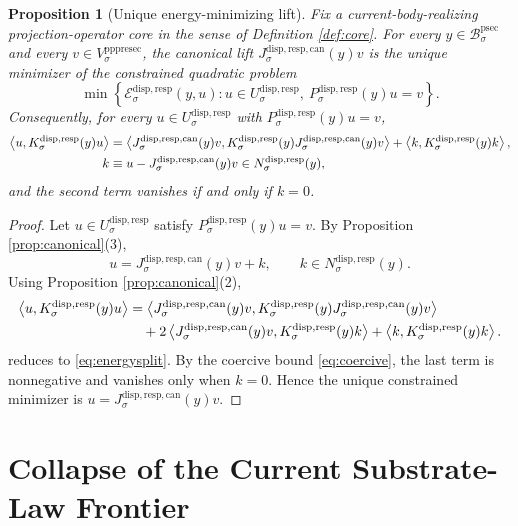 \documentclass[11pt]{article}
\newcommand{\ProtoSectionBody}[1]{\mathcal B_{#1}^{\mathrm{psec}}}
\newcommand{\PrePreProtoSectionVertical}[1]{V_{#1}^{\mathrm{pppresec}}}
\newcommand{\SubstrateCarrier}[1]{U_{#1}^{\mathrm{disp,resp}}}
\newcommand{\SubstrateProjection}[1]{P_{#1}^{\mathrm{disp,resp}}}
\newcommand{\SubstrateOperator}[1]{K_{#1}^{\mathrm{disp,resp}}}
\newcommand{\CanonicalLift}[1]{J_{#1}^{\mathrm{disp,resp,can}}}
\newcommand{\SubstrateKernel}[1]{N_{#1}^{\mathrm{disp,resp}}}
\newcommand{\SubstrateEnergy}[1]{\mathscr E_{#1}^{\mathrm{disp,resp}}}
\newtheorem{proposition}{Proposition}
\begin{document}
\begin{proposition}[Unique energy-minimizing lift]
\label{prop:min}
Fix a current-body-realizing projection-operator core in the sense of Definition \ref{def:core}. For every \(y\in\ProtoSectionBody{\sigma}\) and every \(v\in\PrePreProtoSectionVertical{\sigma}\), the canonical lift \(\CanonicalLift{\sigma}(y)v\) is the unique minimizer of the constrained quadratic problem
\begin{equation}
\min\left\{
\SubstrateEnergy{\sigma}(y,u):
u\in\SubstrateCarrier{\sigma},
\ \SubstrateProjection{\sigma}(y)u=v
\right\}.
\label{eq:minproblem}
\end{equation}
Consequently, for every \(u\in\SubstrateCarrier{\sigma}\) with \(\SubstrateProjection{\sigma}(y)u=v\),
\begin{equation}
\begin{aligned}
\ev{u,\SubstrateOperator{\sigma}(y)u}
&=
\ev{
\CanonicalLift{\sigma}(y)v,
\SubstrateOperator{\sigma}(y)\CanonicalLift{\sigma}(y)v
}
+
\ev{k,\SubstrateOperator{\sigma}(y)k},\\
k
&\equiv
u-\CanonicalLift{\sigma}(y)v
\in
\SubstrateKernel{\sigma}(y),
\end{aligned}
\label{eq:energysplit}
\end{equation}
and the second term vanishes if and only if \(k=0\).
\end{proposition}

\begin{proof}
Let \(u\in\SubstrateCarrier{\sigma}\) satisfy \(\SubstrateProjection{\sigma}(y)u=v\). By Proposition \ref{prop:canonical}(3),
\[
u
=
\CanonicalLift{\sigma}(y)v+k,
\qquad
k\in\SubstrateKernel{\sigma}(y).
\]
Using Proposition \ref{prop:canonical}(2),
\[
\begin{aligned}
\ev{u,\SubstrateOperator{\sigma}(y)u}
&=
\ev{
\CanonicalLift{\sigma}(y)v,
\SubstrateOperator{\sigma}(y)\CanonicalLift{\sigma}(y)v
}\\
&\quad+
2\ev{
\CanonicalLift{\sigma}(y)v,
\SubstrateOperator{\sigma}(y)k
}
+
\ev{k,\SubstrateOperator{\sigma}(y)k}.
\end{aligned}
\]
reduces to \eqref{eq:energysplit}. By the coercive bound \eqref{eq:coercive}, the last term is nonnegative and vanishes only when \(k=0\). Hence the unique constrained minimizer is \(u=\CanonicalLift{\sigma}(y)v\).
\end{proof}

\section{Collapse of the Current Substrate-Law Frontier}
\end{document}
